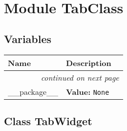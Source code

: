 %
%
%


\section{Module TabClass}

    \label{TabClass}


  \subsection{Variables}

    \vspace{-1cm}
\hspace{\varindent}\begin{longtable}{|p{\varnamewidth}|p{\vardescrwidth}|l}
\cline{1-2}
\cline{1-2} \centering \textbf{Name} & \centering \textbf{Description}& \\
\cline{1-2}
\endhead\cline{1-2}\multicolumn{3}{r}{\small\textit{continued on next page}}\\\endfoot\cline{1-2}
\endlastfoot\raggedright \_\-\_\-p\-a\-c\-k\-a\-g\-e\-\_\-\_\- & \raggedright \textbf{Value:} 
{\tt None}&\\
\cline{1-2}
\end{longtable}



\subsection{Class TabWidget}

